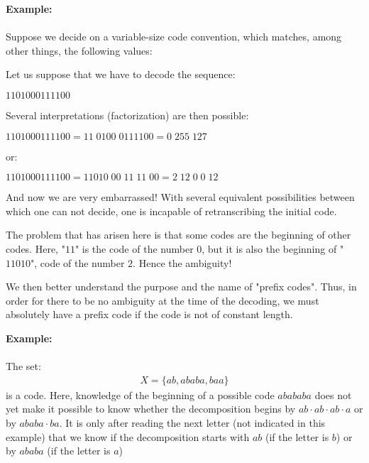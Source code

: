 	\begin{tcolorbox}[colframe=black,colback=white,sharp corners]
	\textbf{{\Large {}}Example:}\\\\	
	Suppose we decide on a variable-size code convention, which matches, among other things, the following values:
	
	Let us suppose that we have to decode the sequence: 
	\begin{center}
		$1101000111100$
	\end{center}

	Several interpretations (factorization) are then possible:
	\begin{center}
		$1101000111100 = 11\; 0100\; 0111100 = 0\; 255\; 127$
	\end{center}
	or:
	\begin{center}
		$1101000111100 = 11010\; 00\; 11\; 11\; 00 = 2\; 12\; 0\; 0\; 12$
	\end{center}
	And now we are very embarrassed! With several equivalent possibilities between which one can not decide, one is incapable of retranscribing the initial code.

	The problem that has arisen here is that some codes are the beginning of other codes. Here, "$11$" is the code of the number $0$, but it is also the beginning of "$11010$", code of the number $2$. Hence the ambiguity!
	\end{tcolorbox}
	We then better understand the purpose and the name of "prefix codes". Thus, in order for there to be no ambiguity at the time of the decoding, we must absolutely have a prefix code if the code is not of constant length.
	\begin{tcolorbox}[colframe=black,colback=white,sharp corners]
	\textbf{{\Large {}}Example:}\\\\	
	The set:
	\begin{gather*}
		X=\{ab,ababa,baa\}
	\end{gather*}
	is a code. Here, knowledge of the beginning of a possible code $abababa$ does not yet make it possible to know whether the decomposition begins by $ab\cdot ab\cdot ab\cdot a$ or by $ababa\cdot ba$. It is only after reading the next letter (not indicated in this example) that we know if the decomposition starts with $ab$ (if the letter is $b$) or by $ababa$ (if the letter is $a$)
	\end{tcolorbox}
	
